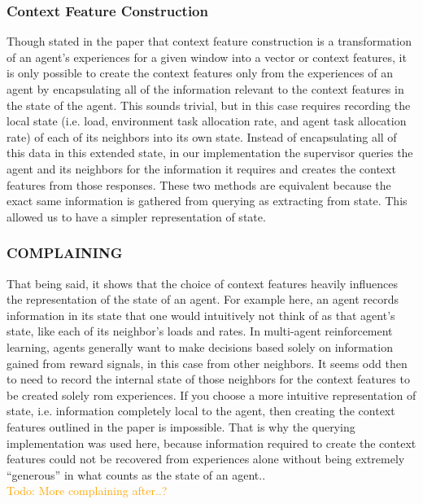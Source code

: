 \documentclass[letterpaper]{article}
\newcommand\todo[1]{\textcolor{orange}{Todo: #1}}
\begin{document}
\subsubsection{Context Feature Construction}
Though stated in the paper that context feature construction is a transformation of an agent’s experiences for a given window into a vector or context features, it is only possible to create the context features only from the experiences of an agent by encapsulating all of the information relevant to the context features in the state of the agent. This sounds trivial, but in this case requires recording the local state (i.e. load, environment task allocation rate, and agent task allocation rate) of each of its neighbors into its own state.  Instead of encapsulating all of this data in this extended state, in our implementation the supervisor queries the agent and its neighbors for the information it requires and creates the context features from those responses.  These two methods are equivalent because the exact same information is gathered from querying as extracting from state.  This allowed us to have a simpler representation of state.

\subsubsection{COMPLAINING}
That being said, it shows that the choice of context features heavily influences the representation of the state of an agent.  For example here, an agent records information in its state that one would intuitively not think of as that agent’s state, like each of its neighbor’s loads and rates.  In multi-agent reinforcement learning, agents generally want to make decisions based solely on information gained from reward signals, in this case from other neighbors.  It seems odd then to need to record the internal state of those neighbors for the context features to be created solely rom experiences.  If you choose a more intuitive representation of state, i.e. information completely local to the agent, then creating the context features outlined in the paper is impossible. That is why the querying implementation was used here, because information required to create the context features could not be recovered from experiences alone without being extremely “generous” in what counts as the state of an agent..
\\\todo{More complaining after..?}
\end{document}

